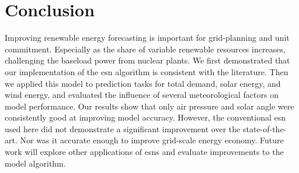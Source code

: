\section{Conclusion}

Improving renewable energy forecasting is important for grid-planning
and unit commitment. Especially as the share of variable renewable resources
increases, challenging the baseload power from nuclear plants. We first
demonstrated that our implementation of the \gls{esn} algorithm is consistent
with the literature. Then we applied this model to prediction tasks for
total demand, solar energy, and wind energy, and evaluated the influence of
several meteorological factors on model performance. Our results show that only
air pressure and solar angle were consistently good at improving model accuracy.
However, the conventional \gls{esn} used here did not demonstrate a significant
improvement over the state-of-the-art. Nor was it accurate enough to improve
grid-scale energy economy. Future work will explore other applications of \glspl{esn} and evaluate improvements to the model algorithm.
